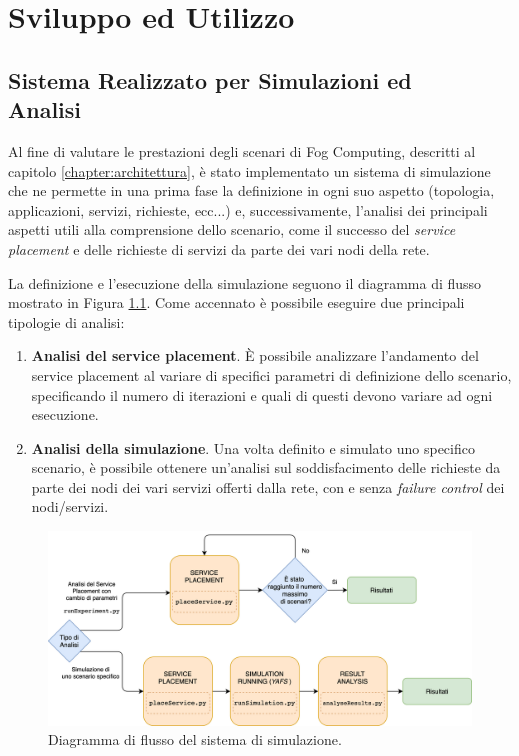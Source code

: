 \chapter{Sviluppo ed Utilizzo}
\label{chapter:implementazione}

\section[Sistema Realizzato per Simulazioni ed Analisi]{Sistema Realizzato per Simulazioni ed\\ Analisi}
\label{section:sistema_analisi}

Al fine di valutare le prestazioni degli scenari di Fog Computing, descritti al capitolo \ref{chapter:architettura}, è stato implementato un sistema di simulazione che ne permette in una prima fase la definizione in ogni suo aspetto (topologia, applicazioni, servizi, richieste, ecc...) e, successivamente, l'analisi dei principali aspetti utili alla comprensione dello scenario, come il successo del \textit{service placement} e delle richieste di servizi da parte dei vari nodi della rete.

La definizione e l'esecuzione della simulazione seguono il diagramma di flusso mostrato in Figura \ref{fig:sim_flow_diagram}. Come accennato è possibile eseguire due principali tipologie di analisi:
\begin{enumerate}
	\item \textbf{Analisi del service placement}. È possibile analizzare l'andamento del service placement al variare di specifici parametri di definizione dello scenario, specificando il numero di iterazioni e quali di questi devono variare ad ogni esecuzione.
	\item \textbf{Analisi della simulazione}. Una volta definito e simulato uno specifico scenario, è possibile ottenere un'analisi sul soddisfacimento delle richieste da parte dei nodi dei vari servizi offerti dalla rete, con e senza \textit{failure control} dei nodi/servizi.
\end{enumerate}


\begin{figure}[!ht]
  \includegraphics[width=14cm]{images/sim_flow_diagram}
  \centering
  \caption{Diagramma di flusso del sistema di simulazione.}
  \label{fig:sim_flow_diagram}
\end{figure}

